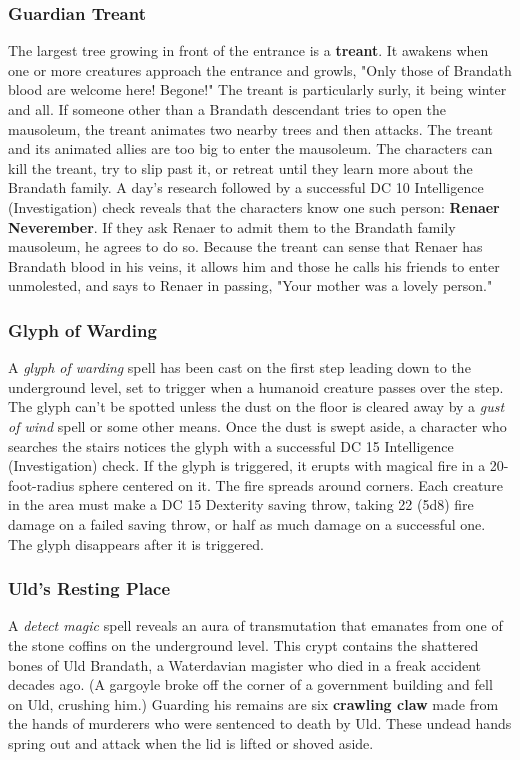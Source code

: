 \documentclass[10pt,a4paper,twoside,twocolumn,openany,nodeprecatedcode]{dndbook}
\begin{document}
\subsubsection{Guardian Treant}
The largest tree growing in front of the entrance is a \textbf{treant}. It awakens when one or more creatures approach the entrance and growls, "Only those of Brandath blood are welcome here! Begone!" The treant is particularly surly, it being winter and all.
If someone other than a Brandath descendant tries to open the mausoleum, the treant animates two nearby trees and then attacks. The treant and its animated allies are too big to enter the mausoleum.
The characters can kill the treant, try to slip past it, or retreat until they learn more about the Brandath family. A day's research followed by a successful DC 10 Intelligence (Investigation) check reveals that the characters know one such person: \textbf{Renaer Neverember}. If they ask Renaer to admit them to the Brandath family mausoleum, he agrees to do so. Because the treant can sense that Renaer has Brandath blood in his veins, it allows him and those he calls his friends to enter unmolested, and says to Renaer in passing, "Your mother was a lovely person."
\subsubsection{Glyph of Warding}
A \textit{glyph of warding} spell has been cast on the first step leading down to the underground level, set to trigger when a humanoid creature passes over the step. The glyph can't be spotted unless the dust on the floor is cleared away by a \textit{gust of wind} spell or some other means. Once the dust is swept aside, a character who searches the stairs notices the glyph with a successful DC 15 Intelligence (Investigation) check.
If the glyph is triggered, it erupts with magical fire in a 20-foot-radius sphere centered on it. The fire spreads around corners. Each creature in the area must make a DC 15 Dexterity saving throw, taking 22 (5d8) fire damage on a failed saving throw, or half as much damage on a successful one. The glyph disappears after it is triggered.
\subsubsection{Uld's Resting Place}
A \textit{detect magic} spell reveals an aura of transmutation that emanates from one of the stone coffins on the underground level. This crypt contains the shattered bones of Uld Brandath, a Waterdavian magister who died in a freak accident decades ago. (A gargoyle broke off the corner of a government building and fell on Uld, crushing him.) Guarding his remains are six \textbf{crawling claw} made from the hands of murderers who were sentenced to death by Uld. These undead hands spring out and attack when the lid is lifted or shoved aside.
\end{document}
